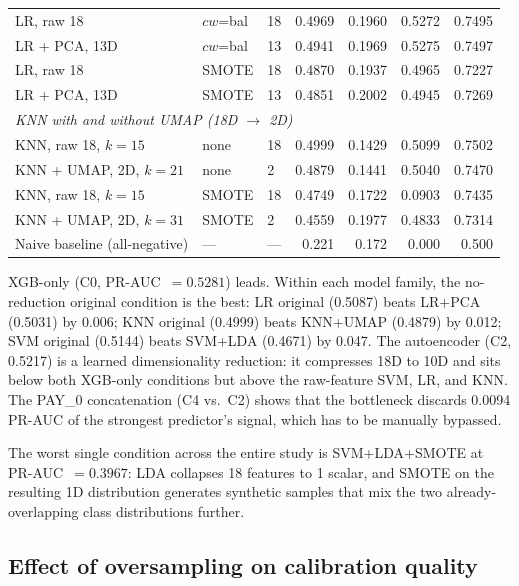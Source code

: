 \documentclass[12pt,a4paper]{article}
\begin{document}
\begin{table}[H]
\begin{tabular}{lllrrrr}
LR, raw 18                   & $cw$=bal  & 18 & 0.4969 & 0.1960 & 0.5272 & 0.7495 \\
LR + PCA, 13D                & $cw$=bal  & 13 & 0.4941 & 0.1969 & 0.5275 & 0.7497 \\
LR, raw 18                   & SMOTE     & 18 & 0.4870 & 0.1937 & 0.4965 & 0.7227 \\
LR + PCA, 13D                & SMOTE     & 13 & 0.4851 & 0.2002 & 0.4945 & 0.7269 \\
\midrule
\multicolumn{7}{l}{\textit{KNN with and without UMAP (18D $\to$ 2D)}} \\
KNN, raw 18, $k=15$          & none  & 18 & 0.4999 & 0.1429 & 0.5099 & 0.7502 \\
KNN + UMAP, 2D, $k=21$       & none  &  2 & 0.4879 & 0.1441 & 0.5040 & 0.7470 \\
KNN, raw 18, $k=15$          & SMOTE & 18 & 0.4749 & 0.1722 & 0.0903 & 0.7435 \\
KNN + UMAP, 2D, $k=31$       & SMOTE &  2 & 0.4559 & 0.1977 & 0.4833 & 0.7314 \\
\midrule
Naive baseline (all-negative) & ---  & --- & 0.221 & 0.172 & 0.000 & 0.500 \\
\bottomrule
\end{tabular}
\end{table}

XGB-only (C0, PR-AUC~$= 0.5281$) leads. Within each model family, the
no-reduction original condition is the best: LR original (0.5087) beats
LR+PCA (0.5031) by 0.006; KNN original (0.4999) beats KNN+UMAP (0.4879)
by 0.012; SVM original (0.5144) beats SVM+LDA (0.4671) by 0.047. The
autoencoder (C2, 0.5217) is a learned dimensionality reduction: it compresses
18D to 10D and sits below both XGB-only conditions but above the raw-feature
SVM, LR, and KNN. The PAY\_0 concatenation (C4 vs.\ C2) shows that the
bottleneck discards 0.0094 PR-AUC of the strongest predictor's signal, which
has to be manually bypassed.

The worst single condition across the entire study is SVM+LDA+SMOTE at
PR-AUC~$= 0.3967$: LDA collapses 18 features to 1 scalar, and SMOTE on
the resulting 1D distribution generates synthetic samples that mix the two
already-overlapping class distributions further.

\subsection{Effect of oversampling on calibration quality}
\end{document}
